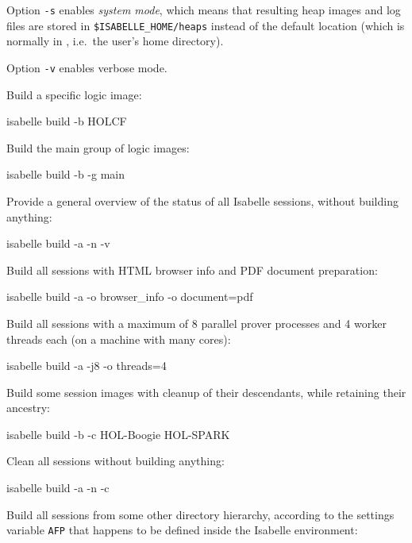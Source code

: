 \begin{isabellebody}
\begin{isamarkuptext}
  \medskip Option \verb|-s| enables \emph{system mode}, which
  means that resulting heap images and log files are stored in
  \verb|$ISABELLE_HOME/heaps| instead of the default location
  \hyperlink{setting.ISABELLE-OUTPUT}{\mbox{}} (which is normally in \hyperlink{setting.ISABELLE-HOME-USER}{\mbox{}}, i.e.\ the user's home directory).

  \medskip Option \verb|-v| enables verbose mode.%
\end{isamarkuptext}%
\isamarkuptrue%
%
\isamarkuptrue%
%
\begin{isamarkuptext}%
Build a specific logic image:
\begin{ttbox}
isabelle build -b HOLCF
\end{ttbox}

  \smallskip Build the main group of logic images:
\begin{ttbox}
isabelle build -b -g main
\end{ttbox}

  \smallskip Provide a general overview of the status of all Isabelle
  sessions, without building anything:
\begin{ttbox}
isabelle build -a -n -v
\end{ttbox}

  \smallskip Build all sessions with HTML browser info and PDF
  document preparation:
\begin{ttbox}
isabelle build -a -o browser_info -o document=pdf
\end{ttbox}

  \smallskip Build all sessions with a maximum of 8 parallel prover
  processes and 4 worker threads each (on a machine with many cores):
\begin{ttbox}
isabelle build -a -j8 -o threads=4
\end{ttbox}

  \smallskip Build some session images with cleanup of their
  descendants, while retaining their ancestry:
\begin{ttbox}
isabelle build -b -c HOL-Boogie HOL-SPARK
\end{ttbox}

  \smallskip Clean all sessions without building anything:
\begin{ttbox}
isabelle build -a -n -c
\end{ttbox}

  \smallskip Build all sessions from some other directory hierarchy,
  according to the settings variable \verb|AFP| that happens to
  be defined inside the Isabelle environment:
%
\end{isamarkuptext}%
\isamarkuptrue%
%
\isadelimtheory
%
\endisadelimtheory
%
\isatagtheory
{}\isamarkupfalse%
%
\endisatagtheory
{\isafoldtheory}%
%
\isadelimtheory
%
\endisadelimtheory
\isanewline
\end{isabellebody}%

